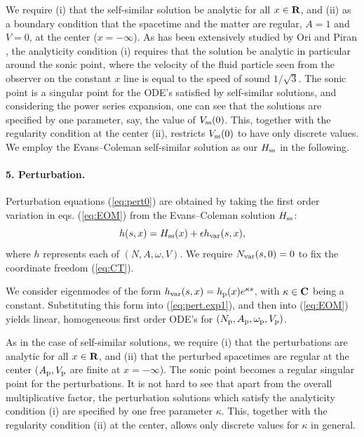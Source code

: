 We require (i) that the
self-similar solution be analytic for all $x \in {\bf R}$, and (ii) as a
boundary condition that the spacetime and the matter are regular,
$A=1$ and $V=0$, at the center ($x = - \infty$).
As has been extensively studied by Ori and  Piran \cite{OP89},
the analyticity condition (i) requires that
the solution be analytic in particular around
the sonic point, where the velocity of the fluid particle seen
from the observer on the
constant $x$ line is equal to the speed of sound $1/\sqrt{3}$.
The sonic point is a singular point for the ODE's
satisfied by
self-similar solutions, and considering the power series
expansion, one can see that
the solutions are specified by one parameter,
say, the value of $V_{\rm ss}(0)$.
This, together with the regularity condition at the center (ii),
restricts $V_{\rm ss}(0)$ to have only discrete values.
We employ the Evans--Coleman
self-similar solution as our $H_{\rm ss}$ in the following.




\paragraph*{5. Perturbation.}
\label{pert}
Perturbation equations (\ref{eq:pert0}) are obtained by taking the first order
variation in eqs. (\ref{eq:EOM}) from the
Evans--Coleman solution $H_{\rm ss}$:
\begin{equation}
        h(s,x) = H_{\rm ss}(x) + \epsilon  h_{\rm var}(s,x),
        \label{eq:pert.exp1}
\end{equation}
where $h$ represents each of $(N, A, \omega, V)$.
We require $N_{\rm var}(s,0)=0$ to fix the coordinate freedom (\ref{eq:CT}).

We consider
eigenmodes of the form $h_{\rm var}(s,x) = h_{\rm p}(x)e^{\kappa s}$,
with $\kappa \in {\bf C}$ being a constant.  Substituting this form into
(\ref{eq:pert.exp1}), and then into (\ref{eq:EOM})
yields linear, homogeneous first order
ODE's for $(N_{\rm p}, A_{\rm p}, \omega_{\rm p}, V_{\rm p})$.

As in the case of self-similar solutions, we require
(i) that the perturbations are analytic for all $x \in {\bf R}$, and
(ii) that the perturbed spacetimes are regular at the center
($A_{\rm p}, V_{\rm p}$ are finite at $x = - \infty$).
The sonic point becomes  a regular singular
point for the perturbations.
It is not hard to see that
apart from the overall multiplicative factor,
the perturbation solutions which satisfy the analyticity condition (i)
are specified by one free parameter $\kappa$.
This, together with the regularity condition (ii) at the center, allows
only discrete values for $\kappa$ in general.


